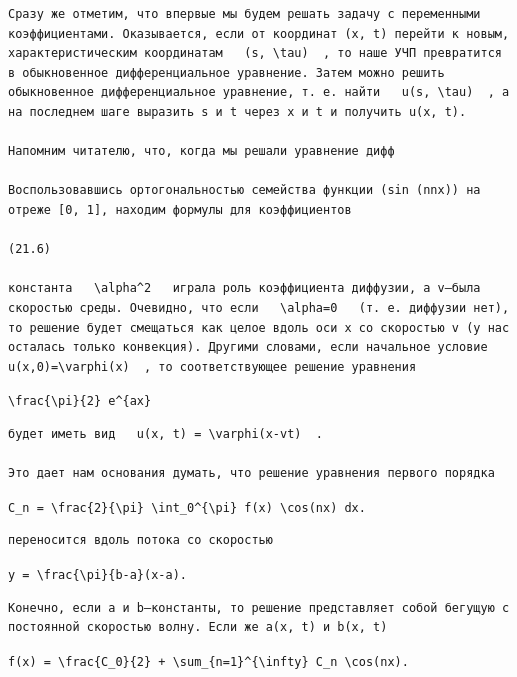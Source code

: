 \documentclass[
  ukrainian,
]{article}
\begin{document}
\begin{verbatim}
Сразу же отметим, что впервые мы будем решать задачу с переменными коэффициентами. Оказывается, если от координат (x, t) перейти к новым, характеристическим координатам   (s, \tau)  , то наше УЧП превратится в обыкновенное дифференциальное уравнение. Затем можно решить обыкновенное дифференциальное уравнение, т. е. найти   u(s, \tau)  , а на последнем шаге выразить s и t через x и t и получить u(x, t).

Напомним читателю, что, когда мы решали уравнение дифф

Воспользовавшись ортогональностью семейства функции (sin (nnx)) на отреже [0, 1], находим формулы для коэффициентов

(21.6)

константа   \alpha^2   играла роль коэффициента диффузии, а v—была скоростью среды. Очевидно, что если   \alpha=0   (т. е. диффузии нет), то решение будет смещаться как целое вдоль оси x со скоростью v (у нас осталась только конвекция). Другими словами, если начальное условие   u(x,0)=\varphi(x)  , то соответствующее решение уравнения
\end{verbatim}

\texttt{\textbackslash{}frac\{\textbackslash{}pi\}\{2\}\ e\^{}\{ax\}}

\begin{verbatim}
будет иметь вид   u(x, t) = \varphi(x-vt)  .

Это дает нам основания думать, что решение уравнения первого порядка
\end{verbatim}

\texttt{C\_n\ =\ \textbackslash{}frac\{2\}\{\textbackslash{}pi\}\ \textbackslash{}int\_0\^{}\{\textbackslash{}pi\}\ f(x)\ \textbackslash{}cos(nx)\ dx.}

\begin{verbatim}
переносится вдоль потока со скоростью
\end{verbatim}

\texttt{y\ =\ \textbackslash{}frac\{\textbackslash{}pi\}\{b-a\}(x-a).}

\begin{verbatim}
Конечно, если a и b—константы, то решение представляет собой бегущую с постоянной скоростью волну. Если же a(x, t) и b(x, t)
\end{verbatim}

\texttt{f(x)\ =\ \textbackslash{}frac\{C\_0\}\{2\}\ +\ \textbackslash{}sum\_\{n=1\}\^{}\{\textbackslash{}infty\}\ C\_n\ \textbackslash{}cos(nx).}
\end{document}
